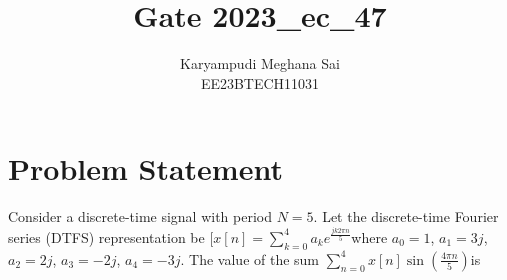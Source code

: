 \documentclass[12pt]{article}
\title{Gate 2023\_ec\_47}
\author{Karyampudi Meghana Sai \\
        EE23BTECH11031}
\begin{document}
\maketitle

\section*{Problem Statement}
Consider a discrete-time signal with period $N=5$. Let the discrete-time Fourier series (DTFS) representation be $[ x[n] = \sum\limits_{k=0}^{4} a_k e^{\frac{jk2\pi n}{5}} $where $a_0=1$, $a_1=3j$, $a_2=2j$, $a_3=-2j$, $a_4=-3j$. The value of the sum $\sum\limits_{n=0}^{4}x[n] \sin\left(\frac{4\pi n}{5}\right) $is
\end{document}
